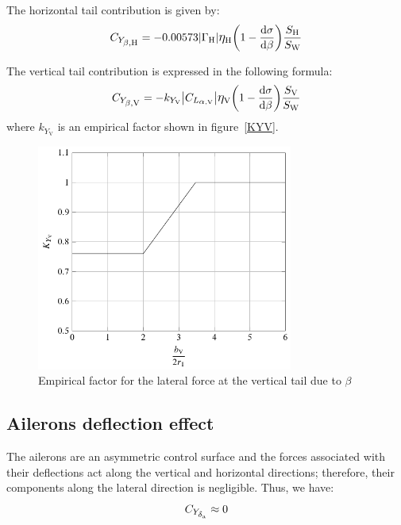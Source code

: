 The horizontal tail contribution is given by:
\begin{equation}
\label{eq:sideslipH}
\CYbetaH = -0.00573 \abs \GammaH \etaH \biggl( 1 - \frac{\mathrm{d}\sigma}{\mathrm{d}\beta} \biggr) \frac{\SH}{\SW}
\end{equation}

The vertical tail contribution is expressed in the following formula:
\begin{equation}
\label{eq:sideslipV}
\CYbetaV = - k_{Y_\mathrm V} \big|\CLalphaV \big| \etaV \biggl( 1 - \frac{\mathrm{d}\sigma}{\mathrm{d}\beta} \biggr) \frac{\SV}{\SW}
\end{equation}
where $k_{Y_\mathrm V}$ is an empirical factor shown in figure~\vref{KYV}.

\begin{figure}[htbp] 
\centering
\includegraphics[width=0.75\textwidth]{Immagini/Capitolo2/4_13-KYV}
\caption[Empirical factor lateral force vertical tail due to $\beta$] {Empirical factor for the lateral force at the vertical tail due to $\beta$}
\label{KYV}
\end{figure}

\subsection{Ailerons deflection effect}
\label{subsec2.1.2}

The ailerons are an asymmetric control surface and the forces associated with their deflections act along the vertical and horizontal directions; therefore, their components along the lateral direction is negligible. Thus, we have:
\begin{equation}
\label{eq:aileronlateralforce}
\CYdeltaa \approx 0
\end{equation}


